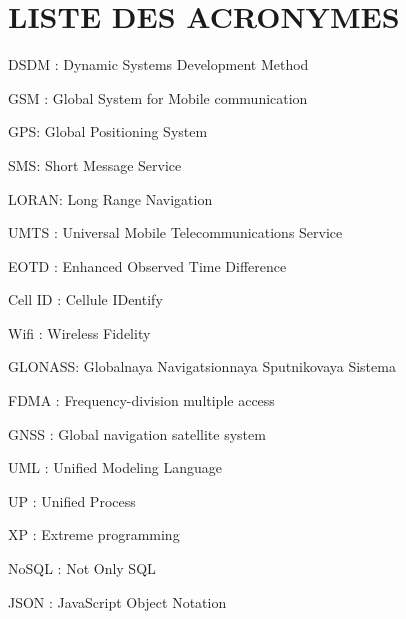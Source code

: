 \chapter*{LISTE DES ACRONYMES}
\large
\noindent DSDM : Dynamic Systems Development Method

\noindent GSM : Global System for Mobile communication

\noindent GPS: Global Positioning System

\noindent SMS: Short Message Service

\noindent LORAN: Long Range Navigation

\noindent UMTS : Universal Mobile Telecommunications Service

\noindent EOTD : Enhanced Observed Time Difference

\noindent Cell ID : Cellule IDentify

\noindent Wifi : Wireless Fidelity

\noindent GLONASS: Globalnaya Navigatsionnaya Sputnikovaya Sistema

\noindent FDMA : Frequency-division multiple access

\noindent GNSS : Global navigation satellite system

\noindent UML : Unified Modeling Language

\noindent UP : Unified Process

\noindent XP : Extreme programming

\noindent NoSQL : Not Only SQL

\noindent JSON : JavaScript Object Notation

